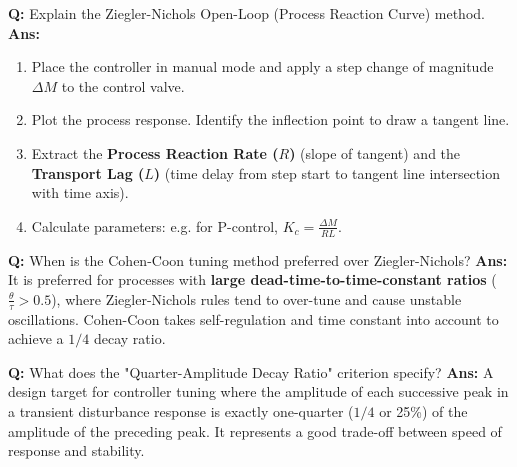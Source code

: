 \documentclass[10pt,a4paper,twocolumn]{article}
\begin{document}
\begin{tcolorbox}[
  colback=white,
  colframe=UnitColorTwo,
  colbacktitle=gray!10!white,
  coltitle=black,
  fonttitle=\bfseries\sffamily\small,
  title={Unit II $\bullet$ Card 9: Ziegler-Nichols Open-Loop Tuning},
  boxrule=1.2pt,
  arc=2mm,
  outer arc=2mm,
  boxsep=1.5mm,
  top=1mm,
  bottom=1mm,
  left=1.5mm,
  right=1.5mm,
  before skip=2.5mm,
  after skip=2.5mm
]
\textbf{Q:} Explain the Ziegler-Nichols Open-Loop (Process Reaction Curve) method.
\tcbline
\textbf{Ans:} \begin{enumerate}
  \item Place the controller in manual mode and apply a step change of magnitude $\Delta M$ to the control valve.
  \item Plot the process response. Identify the inflection point to draw a tangent line.
  \item Extract the \textbf{Process Reaction Rate ($R$)} (slope of tangent) and the \textbf{Transport Lag ($L$)} (time delay from step start to tangent line intersection with time axis).
  \item Calculate parameters: e.g. for P-control, $K_c = \frac{\Delta M}{R L}$.
\end{enumerate}
\end{tcolorbox}


\begin{tcolorbox}[
  colback=white,
  colframe=UnitColorTwo,
  colbacktitle=gray!10!white,
  coltitle=black,
  fonttitle=\bfseries\sffamily\small,
  title={Unit II $\bullet$ Card 10: Cohen-Coon Tuning Rules},
  boxrule=1.2pt,
  arc=2mm,
  outer arc=2mm,
  boxsep=1.5mm,
  top=1mm,
  bottom=1mm,
  left=1.5mm,
  right=1.5mm,
  before skip=2.5mm,
  after skip=2.5mm
]
\textbf{Q:} When is the Cohen-Coon tuning method preferred over Ziegler-Nichols?
\tcbline
\textbf{Ans:} It is preferred for processes with \textbf{large dead-time-to-time-constant ratios} ($\frac{\theta}{\tau} > 0.5$), where Ziegler-Nichols rules tend to over-tune and cause unstable oscillations. Cohen-Coon takes self-regulation and time constant into account to achieve a $1/4$ decay ratio.
\end{tcolorbox}


\begin{tcolorbox}[
  colback=white,
  colframe=UnitColorTwo,
  colbacktitle=gray!10!white,
  coltitle=black,
  fonttitle=\bfseries\sffamily\small,
  title={Unit II $\bullet$ Card 11: Quarter-Amplitude Decay Ratio},
  boxrule=1.2pt,
  arc=2mm,
  outer arc=2mm,
  boxsep=1.5mm,
  top=1mm,
  bottom=1mm,
  left=1.5mm,
  right=1.5mm,
  before skip=2.5mm,
  after skip=2.5mm
]
\textbf{Q:} What does the "Quarter-Amplitude Decay Ratio" criterion specify?
\tcbline
\textbf{Ans:} A design target for controller tuning where the amplitude of each successive peak in a transient disturbance response is exactly one-quarter ($1/4$ or 25\%) of the amplitude of the preceding peak. It represents a good trade-off between speed of response and stability.
\end{tcolorbox}
\end{document}
